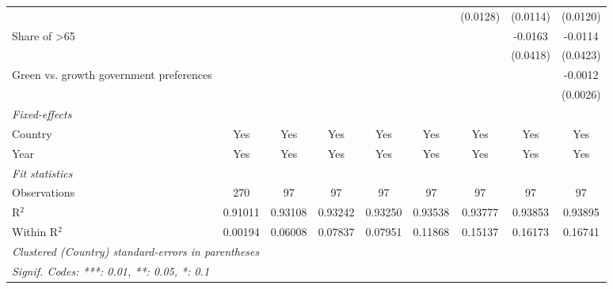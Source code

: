 \begin{table}[htbp]
\begin{tabular}{lcccccccc}
                                                  &          &          &          &          &          & (0.0128) & (0.0114)      & (0.0120)\\   
      Share of >65                                &          &          &          &          &          &          & -0.0163       & -0.0114\\   
                                                  &          &          &          &          &          &          & (0.0418)      & (0.0423)\\   
      Green vs. growth government preferences     &          &          &          &          &          &          &               & -0.0012\\   
                                                  &          &          &          &          &          &          &               & (0.0026)\\   
      \midrule
      \emph{Fixed-effects}\\
      Country                                     & Yes      & Yes      & Yes      & Yes      & Yes      & Yes      & Yes           & Yes\\  
      Year                                        & Yes      & Yes      & Yes      & Yes      & Yes      & Yes      & Yes           & Yes\\  
      \midrule
      \emph{Fit statistics}\\
      Observations                                & 270      & 97       & 97       & 97       & 97       & 97       & 97            & 97\\  
      R$^2$                                       & 0.91011  & 0.93108  & 0.93242  & 0.93250  & 0.93538  & 0.93777  & 0.93853       & 0.93895\\  
      Within R$^2$                                & 0.00194  & 0.06008  & 0.07837  & 0.07951  & 0.11868  & 0.15137  & 0.16173       & 0.16741\\  
      \midrule \midrule
      \multicolumn{9}{l}{\emph{Clustered (Country) standard-errors in parentheses}}\\
      \multicolumn{9}{l}{\emph{Signif. Codes: ***: 0.01, **: 0.05, *: 0.1}}\\
   \end{tabular}
\end{table}


